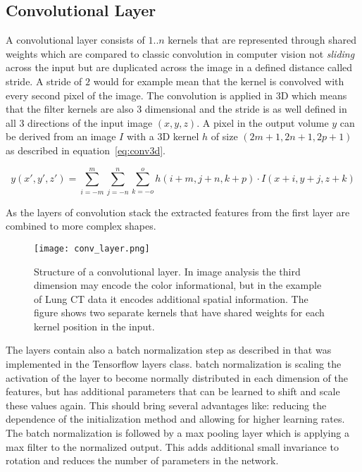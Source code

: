 \documentclass[main.tex]{subfiles}
\begin{document}
\subsection{Convolutional Layer}\label{ss:convlayer}
A convolutional layer consists of $1..n$ kernels that are represented through shared weights which are compared to classic convolution in computer vision not \emph{sliding} across the input but are duplicated across the image in a defined distance called stride. A stride of $2$ would for example mean that the kernel is convolved with every second pixel of the image. The convolution is applied in 3D which means that the filter kernels are also 3 dimensional and the stride is as well defined in all 3 directions of the input image $(x,y,z)$. A pixel in the output volume $y$ can be derived from an image $I$ with a 3D kernel $h$ of size $(2m+1,2n+1,2p+1)$ as described in equation~\eqref{eq:conv3d}.

\begin{equation}
y(x',y',z')=\sum_{i = -m}^{m}\sum_{j = -n}^{n}\sum_{k=-o}^{o} h(i+m,j+n,k+p) \cdot I(x+i,y+j,z+k) 
\label{eq:conv3d}
\end{equation}
 
As the layers of convolution stack the extracted features from the first layer are combined to more complex shapes.

\begin{figure}
\begin{center}
\texttt{[image: conv\_layer.png]}
\end{center}
\caption{Structure of a convolutional layer. In image analysis the third dimension may encode the color informational, but in the example of Lung CT data it encodes additional spatial information. The figure shows two separate kernels that have shared weights for each kernel position in the input.}
\label{fig:conv_layer}
\end{figure}

The layers contain also a batch normalization step as described in \cite{ioffe2015batch} that was implemented in the Tensorflow layers class. batch normalization is scaling the activation of the layer to become normally distributed in each dimension of the features, but has additional parameters that can be learned to shift and scale these values again. This should bring several advantages like: reducing the dependence of the initialization method and allowing for higher learning rates. The batch normalization is followed by a max pooling layer which is applying a max filter to the normalized output. This adds additional small invariance to rotation and reduces the number of parameters in the network.
\end{document}
